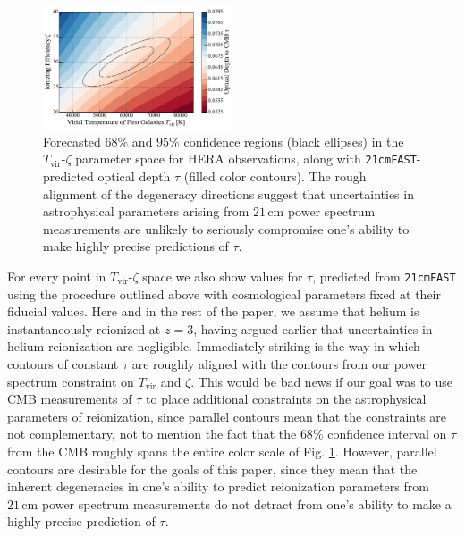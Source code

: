 \documentclass[twocolumn,aps,prd,nofootinbib,showpacs]{revtex4-1}
\begin{document}
\begin{figure}[!]
	\centering
	\includegraphics[width=0.5\textwidth]{figures/21cmDegen_wTau.pdf}
	\caption{Forecasted $68\%$ and $95\%$ confidence regions (black ellipses) in the $T_\textrm{vir}$-$\zeta$ parameter space for HERA observations, along with {\tt 21cmFAST}-predicted optical depth $\tau$ (filled color contours). The rough alignment of the degeneracy directions suggest that uncertainties in astrophysical parameters arising from $21\,\textrm{cm}$ power spectrum measurements are unlikely to seriously compromise one's ability to make highly precise predictions of $\tau$.}
	\label{fig:21cmDegen_wTau}
\end{figure}

For every point in $T_\textrm{vir}$-$\zeta$ space we also show values for $\tau$, predicted from {\tt 21cmFAST} using the procedure outlined above with cosmological parameters fixed at their fiducial values. Here and in the rest of the paper, we assume that helium is instantaneously reionized at $z = 3$, having argued earlier that uncertainties in helium reionization are negligible. Immediately striking is the way in which contours of constant $\tau$ are roughly aligned with the contours from our power spectrum constraint on $T_\textrm{vir}$ and $\zeta$. This would be bad news if our goal was to use CMB measurements of $\tau$ to place additional constraints on the astrophysical parameters of reionization, since parallel contours mean that the constraints are not complementary, not to mention the fact that the $68\%$ confidence interval on $\tau$ from the CMB roughly spans the entire color scale of Fig. \ref{fig:21cmDegen_wTau}. However, parallel contours are desirable for the goals of this paper, since they mean that the inherent degeneracies in one's ability to predict reionization parameters from $21\,\textrm{cm}$ power spectrum measurements do not detract from one's ability to make a highly precise prediction of $\tau$.
\end{document}
